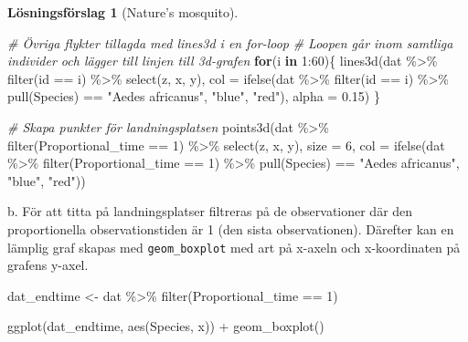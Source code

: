 \documentclass[
]{book}
\newenvironment{Shaded}{\begin{snugshade}}{\end{snugshade}}
\newcommand{\AttributeTok}[1]{\textcolor[rgb]{0.77,0.63,0.00}{#1}}
\newcommand{\CommentTok}[1]{\textcolor[rgb]{0.56,0.35,0.01}{\textit{#1}}}
\newcommand{\ControlFlowTok}[1]{\textcolor[rgb]{0.13,0.29,0.53}{\textbf{#1}}}
\newcommand{\DecValTok}[1]{\textcolor[rgb]{0.00,0.00,0.81}{#1}}
\newcommand{\FloatTok}[1]{\textcolor[rgb]{0.00,0.00,0.81}{#1}}
\newcommand{\FunctionTok}[1]{\textcolor[rgb]{0.00,0.00,0.00}{#1}}
\newcommand{\NormalTok}[1]{#1}
\newcommand{\OtherTok}[1]{\textcolor[rgb]{0.56,0.35,0.01}{#1}}
\newcommand{\SpecialCharTok}[1]{\textcolor[rgb]{0.00,0.00,0.00}{#1}}
\newcommand{\StringTok}[1]{\textcolor[rgb]{0.31,0.60,0.02}{#1}}
\theoremstyle{definition}
\theoremstyle{definition}
\theoremstyle{definition}
\theoremstyle{definition}
\newtheorem{hypothesis}{Lösningsförslag}[chapter]
\theoremstyle{remark}
\begin{document}
\begin{hypothesis}[Nature's mosquito]
\begin{Shaded}
\begin{Highlighting}[]
\CommentTok{\# Övriga flykter tillagda med lines3d i en for{-}loop}
\CommentTok{\# Loopen går inom samtliga individer och lägger till linjen till 3d{-}grafen}
\ControlFlowTok{for}\NormalTok{(i }\ControlFlowTok{in} \DecValTok{1}\SpecialCharTok{:}\DecValTok{60}\NormalTok{)\{}
  \FunctionTok{lines3d}\NormalTok{(dat }\SpecialCharTok{\%\textgreater{}\%} \FunctionTok{filter}\NormalTok{(id }\SpecialCharTok{==}\NormalTok{ i) }\SpecialCharTok{\%\textgreater{}\%} \FunctionTok{select}\NormalTok{(z, x, y), }
          \AttributeTok{col =} \FunctionTok{ifelse}\NormalTok{(dat }\SpecialCharTok{\%\textgreater{}\%} \FunctionTok{filter}\NormalTok{(id }\SpecialCharTok{==}\NormalTok{ i) }\SpecialCharTok{\%\textgreater{}\%} \FunctionTok{pull}\NormalTok{(Species) }\SpecialCharTok{==} \StringTok{"Aedes africanus"}\NormalTok{, }\StringTok{"blue"}\NormalTok{, }\StringTok{"red"}\NormalTok{),}
          \AttributeTok{alpha =} \FloatTok{0.15}\NormalTok{)}
\NormalTok{\}}

\CommentTok{\# Skapa punkter för landningsplatsen}
\FunctionTok{points3d}\NormalTok{(dat }\SpecialCharTok{\%\textgreater{}\%} \FunctionTok{filter}\NormalTok{(Proportional\_time }\SpecialCharTok{==} \DecValTok{1}\NormalTok{) }\SpecialCharTok{\%\textgreater{}\%} \FunctionTok{select}\NormalTok{(z, x, y), }\AttributeTok{size =} \DecValTok{6}\NormalTok{, }
         \AttributeTok{col =} \FunctionTok{ifelse}\NormalTok{(dat }\SpecialCharTok{\%\textgreater{}\%} \FunctionTok{filter}\NormalTok{(Proportional\_time }\SpecialCharTok{==} \DecValTok{1}\NormalTok{) }\SpecialCharTok{\%\textgreater{}\%} \FunctionTok{pull}\NormalTok{(Species) }\SpecialCharTok{==} \StringTok{"Aedes africanus"}\NormalTok{, }\StringTok{"blue"}\NormalTok{, }\StringTok{"red"}\NormalTok{))}
\end{Highlighting}
\end{Shaded}

b. För att titta på landningsplatser filtreras på de observationer där den proportionella observationstiden är 1 (den sista observationen). Därefter kan en lämplig graf skapas med \texttt{geom\_boxplot} med art på x-axeln och x-koordinaten på grafens y-axel.

\begin{Shaded}
\begin{Highlighting}[]
\NormalTok{dat\_endtime }\OtherTok{\textless{}{-}}\NormalTok{ dat }\SpecialCharTok{\%\textgreater{}\%} \FunctionTok{filter}\NormalTok{(Proportional\_time }\SpecialCharTok{==} \DecValTok{1}\NormalTok{)}

\FunctionTok{ggplot}\NormalTok{(dat\_endtime, }\FunctionTok{aes}\NormalTok{(Species, x)) }\SpecialCharTok{+} \FunctionTok{geom\_boxplot}\NormalTok{()}
\end{Highlighting}
\end{Shaded}


\end{hypothesis}
\end{document}
